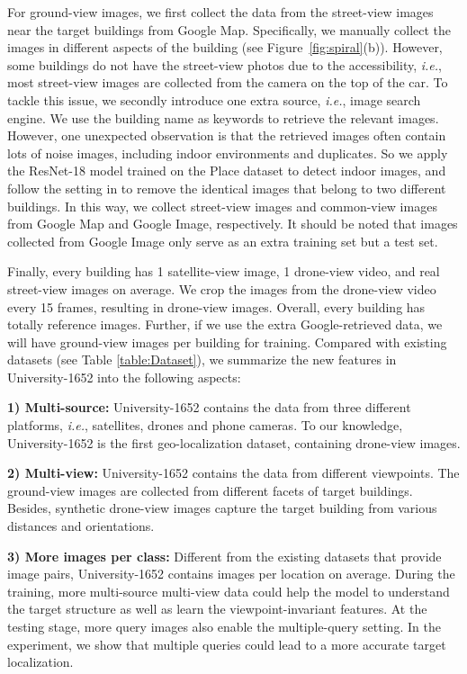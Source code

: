 \documentclass[sigconf]{acmart}
\def\ie{\emph{i.e.}}
\begin{document}
For ground-view images, we first collect the data from the street-view images near the target buildings from Google Map. Specifically, we manually collect the images in different aspects of the building (see Figure~\ref{fig:spiral}(b)). 
However, some buildings do not have the street-view photos due to the accessibility, \ie, most street-view images are collected from the camera on the top of the car. To tackle this issue, we secondly introduce one extra source, \ie, image search engine. We use the building name as keywords to retrieve the relevant images. However, one unexpected observation is that the retrieved images often contain lots of noise images, including indoor environments and duplicates. So we apply the ResNet-18 model trained on the Place dataset \cite{zhou2017places} to detect indoor images, and follow the setting in \cite{krause2016unreasonable} to remove the identical images that belong to two different buildings. In this way, we collect  street-view images and  common-view images from Google Map and Google Image, respectively.
It should be noted that images collected from Google Image only serve as an extra training set but a test set. 

Finally, every building has 1 satellite-view image, 1 drone-view video, and   real street-view images on average. We crop the images from the drone-view video every 15 frames, resulting in  drone-view images. Overall, every building has totally  reference images. Further, if we use the extra Google-retrieved data, we will have  ground-view images per building for training. Compared with existing datasets (see Table \ref{table:Dataset}), we summarize the new features in University-1652 into the following aspects:

\noindent\textbf{1) Multi-source:} University-1652 contains the data from three different platforms, \ie, satellites, drones and phone cameras. To our knowledge, University-1652 is the first geo-localization dataset, containing drone-view images. 

\noindent\textbf{2) Multi-view:} University-1652 contains the data from different viewpoints. The ground-view images are collected from different facets of target buildings. Besides, synthetic drone-view images capture the target building from various distances and orientations. 

\noindent\textbf{3) More images per class:} Different from the existing datasets that provide image pairs, University-1652 contains  images per location on average. During the training, more multi-source  multi-view data could help the model to understand the target structure as well as learn the viewpoint-invariant features. At the testing stage, more query images also enable the multiple-query setting. In the experiment, we show that multiple queries could lead to a more accurate target localization. 
\end{document}
